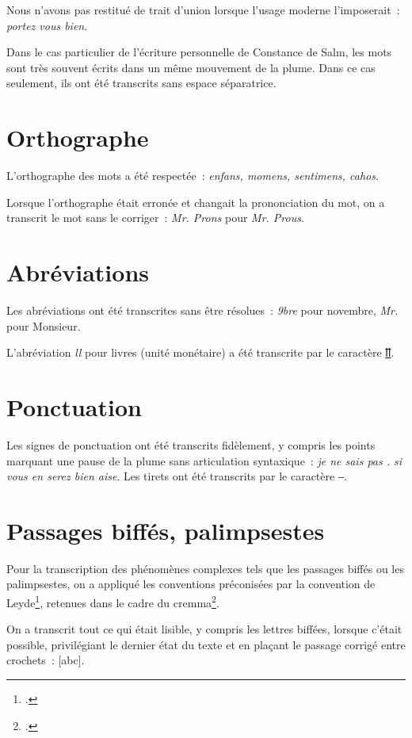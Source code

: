 \documentclass[a4paper,12pt,twoside]{book}
\begin{document}
			Nous n'avons pas restitué de trait d'union lorsque l'usage moderne l'imposerait~: \textit{portez vous bien}.
	
			Dans le cas particulier de l'écriture personnelle de Constance de Salm, les mots sont très souvent écrits dans un même mouvement de la plume. Dans ce cas seulement, ils ont été transcrits sans espace séparatrice.
				
		\section{Orthographe}
			L'orthographe des mots a été respectée~: \textit{enfans, momens, sentimens, cahos}.
			
			Lorsque l'orthographe était erronée et changait la prononciation du mot, on a transcrit le mot sans le corriger~: \textit{Mr. Prons} pour \textit{Mr. Prous}.
		
		\section{Abréviations}
			Les abréviations ont été transcrites sans être résolues~: \textit{9bre} pour novembre, \textit{Mr.} pour Monsieur.
		
			L'abréviation \textit{ll} pour livres (unité monétaire) a été transcrite par le caractère \href{https://mufi.info/m.php?p=muficharinfo&i=4088}{ỻ}.

		\section{Ponctuation}
			Les signes de ponctuation ont été transcrits fidèlement, y compris les points marquant une pause de la plume sans articulation syntaxique~: \textit{je ne sais pas . si vous en serez bien aise}. Les tirets ont été transcrits par le caractère ‒.
		
		\section{Passages biffés, palimpsestes}
			Pour la transcription des phénomènes complexes tels que les passages biffés ou les palimpsestes, on a appliqué les conventions préconisées par la convention de Leyde\footcite{leidenConvention}, retenues dans le cadre du \gls{cremma}\footcite{pincheSeminaireCreationModele2021a}.
			
			On a transcrit tout ce qui était lisible, y compris les lettres biffées, lorsque c'était possible, privilégiant le dernier état du texte et en plaçant le passage corrigé entre crochets~: [abc].
		
\end{document}
